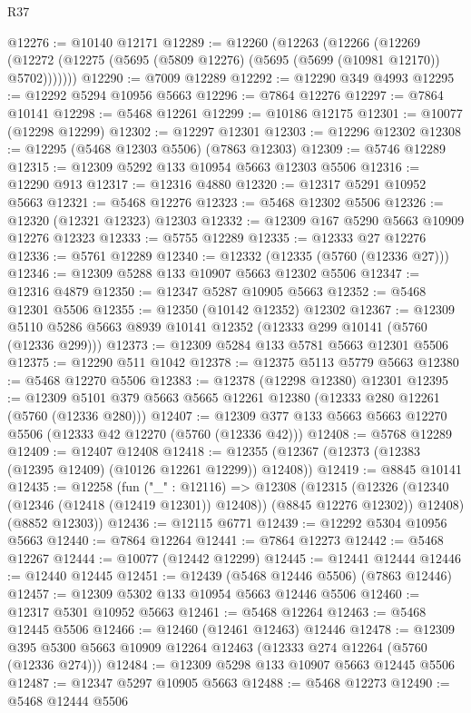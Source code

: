 \begin{lexlean}{R37}
\begin{coremodule}
@12276 := @10140 @12171
@12289 := @12260
    (@12263
      (@12266
        (@12269 (@12272 (@12275 (@5695 (@5809 @12276) (@5695 (@5699 (@10981 @12170)) @5702)))))))
@12290 := @7009 @12289
@12292 := @12290 @349 @4993
@12295 := @12292 @5294 @10956 @5663
@12296 := @7864 @12276
@12297 := @7864 @10141
@12298 := @5468 @12261
@12299 := @10186 @12175
@12301 := @10077 (@12298 @12299)
@12302 := @12297 @12301
@12303 := @12296 @12302
@12308 := @12295 (@5468 @12303 @5506) (@7863 @12303)
@12309 := @5746 @12289
@12315 := @12309 @5292 @133 @10954 @5663 @12303 @5506
@12316 := @12290 @913
@12317 := @12316 @4880
@12320 := @12317 @5291 @10952 @5663
@12321 := @5468 @12276
@12323 := @5468 @12302 @5506
@12326 := @12320 (@12321 @12323) @12303
@12332 := @12309 @167 @5290 @5663 @10909 @12276 @12323
@12333 := @5755 @12289
@12335 := @12333 @27 @12276
@12336 := @5761 @12289
@12340 := @12332 (@12335 (@5760 (@12336 @27)))
@12346 := @12309 @5288 @133 @10907 @5663 @12302 @5506
@12347 := @12316 @4879
@12350 := @12347 @5287 @10905 @5663
@12352 := @5468 @12301 @5506
@12355 := @12350 (@10142 @12352) @12302
@12367 := @12309 @5110 @5286 @5663 @8939 @10141 @12352 (@12333 @299 @10141 (@5760 (@12336 @299)))
@12373 := @12309 @5284 @133 @5781 @5663 @12301 @5506
@12375 := @12290 @511 @1042
@12378 := @12375 @5113 @5779 @5663
@12380 := @5468 @12270 @5506
@12383 := @12378 (@12298 @12380) @12301
@12395 := @12309 @5101 @379 @5663 @5665 @12261 @12380 (@12333 @280 @12261 (@5760 (@12336 @280)))
@12407 := @12309 @377 @133 @5663 @5663 @12270 @5506 (@12333 @42 @12270 (@5760 (@12336 @42)))
@12408 := @5768 @12289
@12409 := @12407 @12408
@12418 := @12355 (@12367 (@12373 (@12383 (@12395 @12409) (@10126 @12261 @12299)) @12408))
@12419 := @8845 @10141
@12435 := @12258
    (fun ("_" : @12116) =>
    @12308
      (@12315
        (@12326 (@12340 (@12346 (@12418 (@12419 @12301)) @12408)) (@8845 @12276 @12302))
        @12408)
      (@8852 @12303))
@12436 := @12115 @6771
@12439 := @12292 @5304 @10956 @5663
@12440 := @7864 @12264
@12441 := @7864 @12273
@12442 := @5468 @12267
@12444 := @10077 (@12442 @12299)
@12445 := @12441 @12444
@12446 := @12440 @12445
@12451 := @12439 (@5468 @12446 @5506) (@7863 @12446)
@12457 := @12309 @5302 @133 @10954 @5663 @12446 @5506
@12460 := @12317 @5301 @10952 @5663
@12461 := @5468 @12264
@12463 := @5468 @12445 @5506
@12466 := @12460 (@12461 @12463) @12446
@12478 := @12309 @395 @5300 @5663 @10909 @12264 @12463 (@12333 @274 @12264 (@5760 (@12336 @274)))
@12484 := @12309 @5298 @133 @10907 @5663 @12445 @5506
@12487 := @12347 @5297 @10905 @5663
@12488 := @5468 @12273
@12490 := @5468 @12444 @5506

\end{coremodule}
\end{lexlean}
